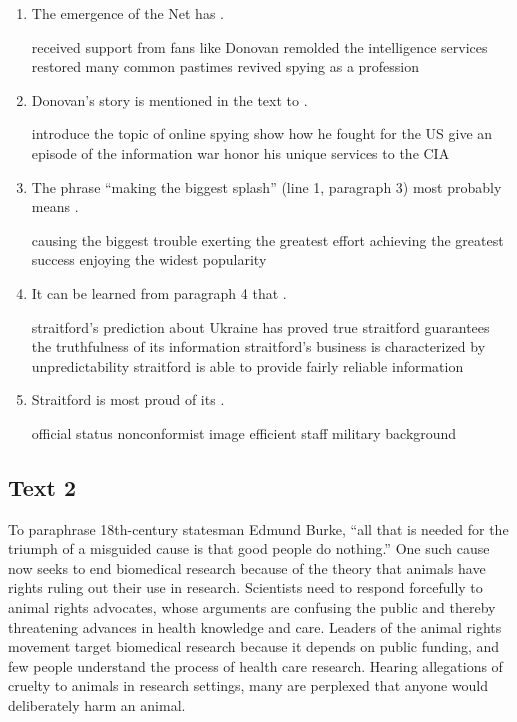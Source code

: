 \begin{enumerate}[resume]
	\item
The emergence of the Net has \lineread.


\fourchoices
{received support from fans like Donovan}
{remolded the intelligence services}
{restored many common pastimes}
{revived spying as a profession}


\item
 Donovan's story is mentioned in the text to \lineread.

\fourchoices
{introduce the topic of online spying}
{show how he fought for the US}
{give an episode of the information war}
{honor his unique services to the CIA}


\item
The phrase ``making the biggest splash'' (line 1, paragraph 3) most
probably means \lineread.


\fourchoices
{causing the biggest trouble}
{exerting the greatest effort}
{achieving the greatest success}
{enjoying the widest popularity}



\item
 It can be learned from paragraph 4 that \lineread.

\fourchoices
{straitford's prediction about Ukraine has proved true}
{straitford guarantees the truthfulness of its information}
{straitford's business is characterized by unpredictability}
{straitford is able to provide fairly reliable information}


\item
Straitford is most proud of its \lineread.


\fourchoices
{official status}
{nonconformist image}
{efficient staff}
{military background}



\end{enumerate}


\newpage
\subsection{Text 2}


To paraphrase 18th-century statesman Edmund Burke,
``all that is needed for the triumph of a misguided cause is that good
people do nothing.'' One such cause now seeks to end biomedical research
because of the theory that animals have rights ruling out their use in
research. Scientists need to respond forcefully to animal rights
advocates, whose arguments are confusing the public and thereby
threatening advances in health knowledge and care. Leaders of the animal
rights movement target biomedical research because it depends on public
funding, and few people understand the process of health care research.
Hearing allegations of cruelty to animals in research settings, many are
perplexed that anyone would deliberately harm an animal.

